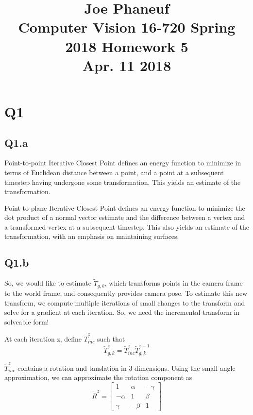 \documentclass[12pt]{article}
\begin{document}
\title{Joe Phaneuf \\ Computer Vision 16-720 Spring 2018 Homework 5 \\ Apr. 11 2018 }
\date{}
\author{}
\maketitle

\newpage


\section{Q1}
\subsection{Q1.a}
Point-to-point Iterative Closest Point defines an energy function to minimize in terms of Euclidean distance between a point, and a point at a subsequent timestep having undergone some transformation. This yields an estimate of the transformation. 

Point-to-plane Iterative Closest Point defines an energy function to minimize the dot product of a normal vector estimate and the difference between a vertex and a transformed vertex at a subsequent timestep. This also yields an estimate of the transformation, with an emphasis on maintaining surfaces.

\subsection{Q1.b}
So, we would like to estimate $\tilde{T}_{g,k}$, which transforms points in the camera frame to the world frame, and consequently provides camera pose.  
To estimate this new transform, we compute multiple iterations of small changes to the transform and solve for a gradient at each iteration. So, we need the incremental transform in solveable form!

At each iteration z, define $\tilde{T}_{inc}^{z}$ such that 
\begin{equation}
\tilde{T}_{g,k}^{z} = \tilde{T}_{inc}^{z} \tilde {T}_{g,k}^{z-1}
\end{equation}  
  
$\tilde{T}_{inc}^{z}$ contains a rotation and tanslation in 3 dimensions. Using the small angle approximation, we can approximate the rotation component as
\begin{equation}
\tilde{R}^{z} = 
\begin{bmatrix}
1 & \alpha & - \gamma \\
- \alpha & 1 & \beta \\
\gamma & - \beta & 1
\end{bmatrix}
\end{equation}
  
\end{document}

